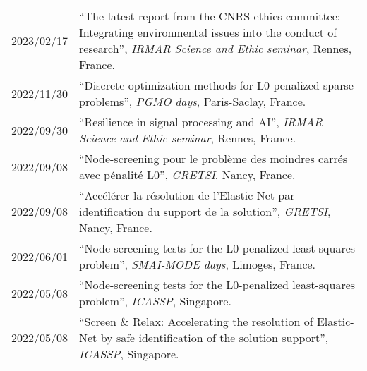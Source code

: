 \begin{longtable}[l]{@{}p{}p{}}
    2023/02/17 & ``The latest report from the CNRS ethics committee: Integrating environmental issues into the conduct of research'', \textit{IRMAR Science and Ethic seminar}, Rennes, France. \\
    2022/11/30 & ``Discrete optimization methods for L0-penalized sparse problems'', \textit{PGMO days}, Paris-Saclay, France. \\
    2022/09/30 & ``Resilience in signal processing and AI'', \textit{IRMAR Science and Ethic seminar}, Rennes, France. \\
    2022/09/08 & ``Node-screening pour le problème des moindres carrés avec pénalité L0'', \textit{GRETSI}, Nancy, France. \\
    2022/09/08 & ``Accélérer la résolution de l’Elastic-Net par identification du support de la solution'', \textit{GRETSI}, Nancy, France. \\
    2022/06/01 & ``Node-screening tests for the L0-penalized least-squares problem'', \textit{SMAI-MODE days}, Limoges, France. \\
    2022/05/08 & ``Node-screening tests for the L0-penalized least-squares problem'', \textit{ICASSP}, Singapore. \\
    2022/05/08 & ``Screen \& Relax: Accelerating the resolution of Elastic-Net by safe identification of the solution support'', \textit{ICASSP}, Singapore.
\end{longtable}